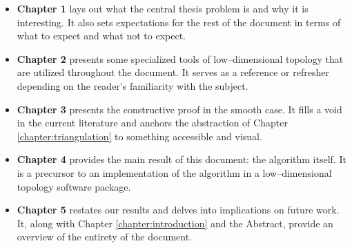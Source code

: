 {\renewcommand\labelitemi{}
	\begin{itemize}
		\item \textbf{Chapter 1} lays out what the central thesis problem is and why it is interesting.  It also sets expectations for the rest of the document in terms of what to expect and what not to expect.
		\item \textbf{Chapter 2} presents some specialized tools of low--dimensional topology that are utilized throughout the document.  It serves as a reference or refresher depending on the reader's familiarity with the subject.
		\item \textbf{Chapter 3} presents the constructive proof in the smooth case.  It fills a void in the current literature and anchors the abstraction of Chapter \ref{chapter:triangulation} to something accessible and visual.
		\item \textbf{Chapter 4} provides the main result of this document: the algorithm itself.  It is a precursor to an implementation of the algorithm in a low--dimensional topology software package.
		\item \textbf{Chapter 5} restates our results and delves into implications on future work.  It, along with Chapter \ref{chapter:introduction} and the Abstract, provide an overview of the entirety of the document.
	\end{itemize}
}